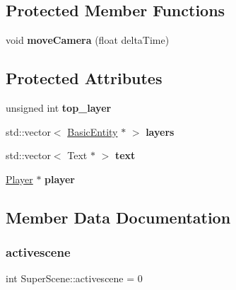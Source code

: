 \subsection*{Protected Member Functions}
\begin{DoxyCompactItemize}
\item 
\mbox{\label{class_super_scene_ac0e2b1126702422c861d3f2cda5f1948}} 
void {\bfseries move\+Camera} (float delta\+Time)
\end{DoxyCompactItemize}
\subsection*{Protected Attributes}
\begin{DoxyCompactItemize}
\item 
\mbox{\label{class_super_scene_a4070e643a586cf61350ae18a0544165b}} 
unsigned int {\bfseries top\+\_\+layer}
\item 
\mbox{\label{class_super_scene_a71b8a4d39ff9910f6b40f3cd110549d9}} 
std\+::vector$<$ \hyperlink{class_basic_entity}{Basic\+Entity} $\ast$ $>$ {\bfseries layers}
\item 
\mbox{\label{class_super_scene_a5a465432cc5223a4035e7bcefe26c07e}} 
std\+::vector$<$ Text $\ast$ $>$ {\bfseries text}
\item 
\mbox{\label{class_super_scene_a3888e131f19e0d6e74120c60cc89507a}} 
\hyperlink{struct_player}{Player} $\ast$ {\bfseries player}
\end{DoxyCompactItemize}


\subsection{Member Data Documentation}
\mbox{\label{class_super_scene_af98d73650372f31f17f19c02fde6f9be}} 
\subsubsection{\texorpdfstring{activescene}{activescene}}
{\footnotesize\ttfamily int Super\+Scene\+::activescene = 0\hspace{0.3cm}{\ttfamily [static]}}


